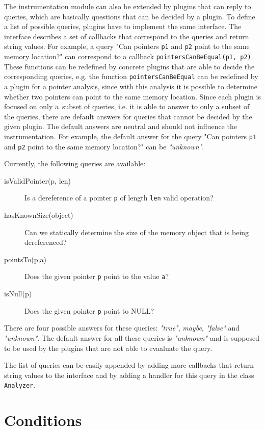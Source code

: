 The instrumentation module can also be extended by plugins that can reply to
queries, which are basically questions that can be decided by a plugin. To
define a list of possible queries, plugins have to implement the same
interface. The interface describes a set of callbacks that correspond to the
queries and return string values. For example, a query "Can pointers
\texttt{p1} and \texttt{p2} point to the same memory location?" can correspond
to a callback \texttt{pointersCanBeEqual(p1, p2)}. These functions can be
redefined by concrete plugins that are able to decide the corresponding
queries, e.g.  the function \texttt{pointersCanBeEqual} can be redefined by a
plugin for a pointer analysis, since with this analysis it is possible to
determine whether two pointers can point to the same memory location. Since
each plugin is focused on only a~subset of queries, i.e. it is able to answer
to only a subset of the queries, there are default answers for queries that
cannot be decided by the given plugin. The default answers are neutral and
should not influence the instrumentation. For example, the default answer for
the query "Can pointers \texttt{p1} and \texttt{p2} point to the same memory
location?" can be \emph{"unknown"}.

Currently, the following queries are available:
\begin{description}
  \item[isValidPointer(p, len)] Is a dereference of a pointer \texttt{p} of
        length \texttt{len} valid operation?
  \item[hasKnownSize(object)] Can we statically determine the size of the memory
         object that is being dereferenced?
  \item[pointsTo(p,a)] Does the given pointer \texttt{p} point to the value \texttt{a}?
  \item[isNull(p)] Does the given pointer \texttt{p} point to NULL?
\end{description}
There are four possible answers for these queries: \emph{"true"},
\emph{maybe}, \emph{"false"} and \emph{"unknown"}. The default answer for all
these queries is \emph{"unknown"} and is supposed to be used by the plugins
that are not able to evaaluate the query.

The list of queries can be easily appended by adding more callbacks that return
string values to the interface and by  adding a
handler for this query in the class \texttt{Analyzer}.

\section{Conditions}\label{sec:conditions}

